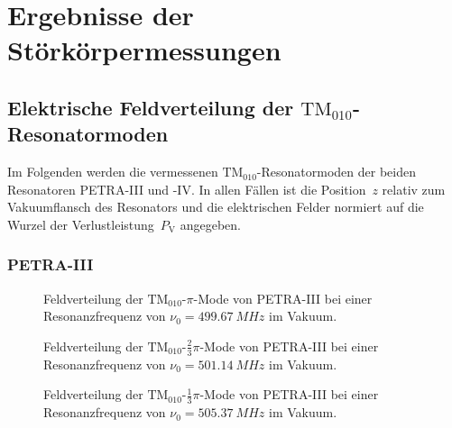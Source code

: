 \chapter{Ergebnisse der Störkörpermessungen}
\label{sec:appendix_felder}

\section{Elektrische Feldverteilung der $\mathrm{TM}_{010}$-Resonatormoden}
\label{app:tm010_felder}
Im Folgenden werden die vermessenen $\mathrm{TM}_{010}$-Resonatormoden der beiden Resonatoren PETRA-III und -IV.
In allen Fällen ist die Position~$z$ relativ zum Vakuumflansch des Resonators und die elektrischen Felder normiert auf die Wurzel der Verlustleistung~$P_\mathrm{V}$ angegeben.

\subsection{PETRA-III}
\FloatBarrier
\begin{figure}[h]
  \centering
  
  \caption[Feldverteilung der $\mathrm{TM}_{010}\text{-}\pi$-Mode von PETRA-III]{Feldverteilung der $\mathrm{TM}_{010}\text{-}\pi$-Mode von PETRA-III bei einer Resonanzfrequenz von $\nu_0 = \SI{499.67}{MHz}$ im Vakuum.}
\end{figure}

\begin{figure}[h]
  \centering
  
  \caption[Feldverteilung der $\mathrm{TM}_{010}\text{-}\frac{2}{3}\pi$-Mode von PETRA-III]{Feldverteilung der $\mathrm{TM}_{010}\text{-}\frac{2}{3}\pi$-Mode von PETRA-III bei einer Resonanzfrequenz von $\nu_0 = \SI{501.14}{MHz}$ im Vakuum.}
\end{figure}

\begin{figure}[h]
  \centering
  
  \caption[Feldverteilung der $\mathrm{TM}_{010}\text{-}\frac{1}{3}\pi$-Mode von PETRA-III]{Feldverteilung der $\mathrm{TM}_{010}\text{-}\frac{1}{3}\pi$-Mode von PETRA-III bei einer Resonanzfrequenz von $\nu_0 = \SI{505.37}{MHz}$ im Vakuum.}
\end{figure}

